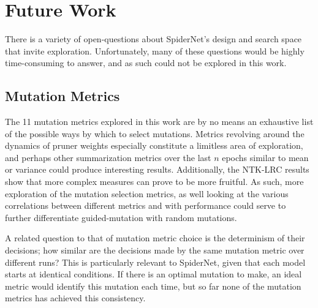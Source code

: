 
\section{Future Work}\label{sect:spider_futurework}
There is a variety of open-questions about SpiderNet's design and search space that invite exploration. Unfortunately, many of these questions would be
highly time-consuming to answer, and as such could not be explored in this work.

\subsection{Mutation Metrics}
The 11 mutation metrics explored in this work are by no means an exhaustive list of the possible ways by which
to select mutations. Metrics revolving around the dynamics of pruner weights especially constitute a limitless
area of exploration, and perhaps other summarization metrics over the last $n$ epochs similar to mean
or variance could produce interesting results. Additionally, the NTK-LRC results show that more complex measures can prove to be more
fruitful. As such, more exploration of the mutation selection metrics, as well looking at the various correlations between
different metrics and with performance could serve to further differentiate guided-mutation with random mutations.

A related question to that of mutation metric choice is the determinism of their decisions; how similar are the decisions
made by the same mutation metric over different runs? This is particularly relevant to SpiderNet, given that each
model starts at identical conditions. If there is an optimal mutation to make, an ideal metric would identify this mutation
each time, but so far none of the mutation metrics has achieved this consistency.

